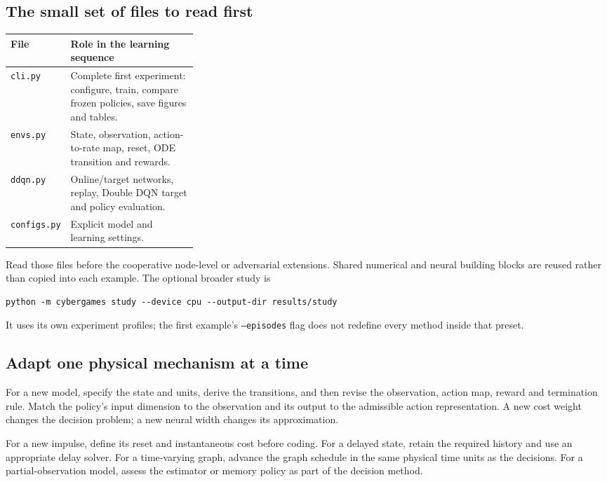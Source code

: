 \documentclass[11pt,a4paper]{article}
\theoremstyle{definition}
\theoremstyle{remark}
\begin{document}
\subsection{The small set of files to read first}
\par\noindent\begin{tabularx}{\linewidth}{@{}p{0.31\linewidth}Y@{}}
\toprule
File & Role in the learning sequence \\
\midrule
\texttt{cli.py} & Complete first experiment: configure, train, compare frozen policies, save figures and tables. \\
\texttt{envs.py} & State, observation, action-to-rate map, reset, ODE transition and rewards. \\
\texttt{ddqn.py} & Online/target networks, replay, Double DQN target and policy evaluation. \\
\texttt{configs.py} & Explicit model and learning settings. \\
\bottomrule
\end{tabularx}\par
Read those files before the cooperative node-level or adversarial extensions. Shared numerical and neural building blocks are reused rather than copied into each example. The optional broader study is
\begin{lstlisting}[language={}]
python -m cybergames study --device cpu --output-dir results/study
\end{lstlisting}
It uses its own experiment profiles; the first example's \texttt{--episodes} flag does not redefine every method inside that preset.

\subsection{Adapt one physical mechanism at a time}
For a new model, specify the state and units, derive the transitions, and then revise the observation, action map, reward and termination rule. Match the policy's input dimension to the observation and its output to the admissible action representation. A new cost weight changes the decision problem; a new neural width changes its approximation.

For a new impulse, define its reset and instantaneous cost before coding. For a delayed state, retain the required history and use an appropriate delay solver. For a time-varying graph, advance the graph schedule in the same physical time units as the decisions. For a partial-observation model, assess the estimator or memory policy as part of the decision method.
\end{document}
